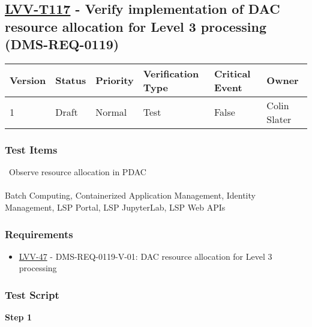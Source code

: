 \hypertarget{lvv-t117---verify-implementation-of-dac-resource-allocation-for-level-3-processing-dms-req-0119}{%
\subsection{\texorpdfstring{\href{https://jira.lsstcorp.org/secure/Tests.jspa\#/testCase/LVV-T117}{LVV-T117}
- Verify implementation of DAC resource allocation for Level 3
processing
(DMS-REQ-0119)}{LVV-T117 - Verify implementation of DAC resource allocation for Level 3 processing (DMS-REQ-0119)}}\label{lvv-t117---verify-implementation-of-dac-resource-allocation-for-level-3-processing-dms-req-0119}}

\begin{longtable}[]{@{}llllll@{}}
\toprule
Version & Status & Priority & Verification Type & Critical Event &
Owner\tabularnewline
\midrule
\endhead
1 & Draft & Normal & Test & False & Colin Slater\tabularnewline
\bottomrule
\end{longtable}

\hypertarget{test-items-17}{%
\subsubsection{Test Items}\label{test-items-17}}

~Observe resource allocation in PDAC\\
~\\
Batch Computing, Containerized Application Management, Identity
Management, LSP Portal, LSP JupyterLab, LSP Web APIs

\hypertarget{requirements-17}{%
\subsubsection{Requirements}\label{requirements-17}}

\begin{itemize}
\tightlist
\item
  \href{https://jira.lsstcorp.org/browse/LVV-47}{LVV-47} -
  DMS-REQ-0119-V-01: DAC resource allocation for Level 3 processing
\end{itemize}

\hypertarget{test-script-17}{%
\subsubsection{Test Script}\label{test-script-17}}

\textbf{Step 1}\\
~\\
~\\


